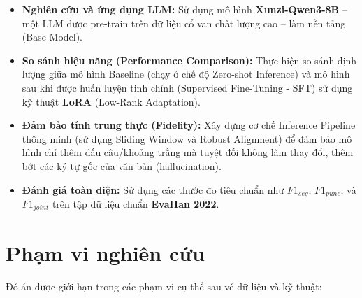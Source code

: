 \begin{itemize}
    \item \textbf{Nghiên cứu và ứng dụng LLM:} Sử dụng mô hình \textbf{Xunzi-Qwen3-8B} – một LLM được pre-train trên dữ liệu cổ văn chất lượng cao – làm nền tảng (Base Model).
    \item \textbf{So sánh hiệu năng (Performance Comparison):} Thực hiện so sánh định lượng giữa mô hình Baseline (chạy ở chế độ Zero-shot Inference) và mô hình sau khi được huấn luyện tinh chỉnh (Supervised Fine-Tuning - SFT) sử dụng kỹ thuật \textbf{LoRA} (Low-Rank Adaptation).
    \item \textbf{Đảm bảo tính trung thực (Fidelity):} Xây dựng cơ chế Inference Pipeline thông minh (sử dụng Sliding Window và Robust Alignment) để đảm bảo mô hình chỉ thêm dấu câu/khoảng trắng mà tuyệt đối không làm thay đổi, thêm bớt các ký tự gốc của văn bản (hallucination).
    \item \textbf{Đánh giá toàn diện:} Sử dụng các thước đo tiêu chuẩn như $F1_{seg}$, $F1_{punc}$, và $F1_{joint}$ trên tập dữ liệu chuẩn \textbf{EvaHan 2022}.
\end{itemize}

\section{Phạm vi nghiên cứu}

Đồ án được giới hạn trong các phạm vi cụ thể sau về dữ liệu và kỹ thuật:

